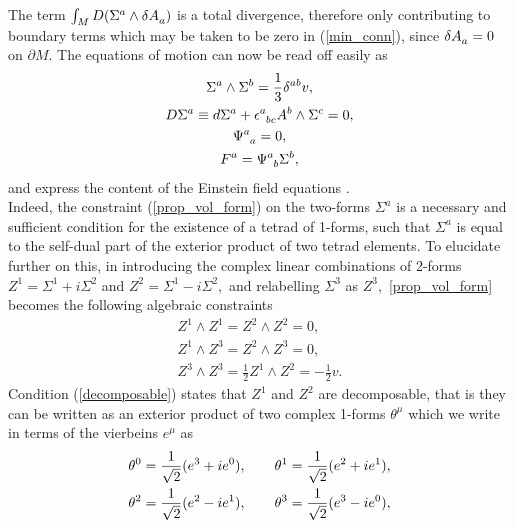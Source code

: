 \documentclass[a4paper,12pt, onecolumn, notitlepage]{article}
\theoremstyle{definition}
\theoremstyle{remark}
\newcommand{\m}{\mu}
\newcommand{\e}{\epsilon}
\begin{document}
The term $\int_{M} D(\Sigma\indices{^a}\wedge\delta A\indices{_a})$ is a total divergence, therefore only contributing to boundary terms which may be taken to be zero in (\ref{min_conn}), since $\delta A\indices{_a}=0$ on $\partial M.$ The equations of motion can now be read off easily as
\begin{subequations}
	\begin{gather}
\label{prop_vol_form}
\Sigma^{a}\wedge\Sigma^{b} = \frac{1}{3}\delta^{ab}v,\\
\label{cov_derivative}
D\Sigma^{a} \equiv d\Sigma^{a} + \e\indices{^a_b_c}A^{b}\wedge\Sigma^{c} = 0,\\
\label{traceless}
\Psi\indices{^a_a} = 0,\\
\label{weyl}
F^{a} = \Psi\indices{^a_b}\Sigma^{b},
	\end{gather}
\end{subequations}
and express the content of the Einstein field equations \cite{capovilla_1989, capovilla_1993}.\\
Indeed, the constraint (\ref{prop_vol_form}) on the two-forms $\Sigma^{a}$ is a necessary and sufficient condition for the existence of a tetrad of 1-forms, such that $\Sigma^{a}$ is equal to the self-dual part of the exterior product of two tetrad elements.
To elucidate further on this, in introducing the complex linear combinations of 2-forms $Z^{1} = \Sigma^{1}+ i\Sigma^{2}$ and $Z^{2} = \Sigma^{1}- i\Sigma^{2},$ and relabelling $\Sigma^{3}$ as $Z^{3},$ \cref{prop_vol_form} becomes the following algebraic constraints
\begin{subequations}
	\begin{gather}
	\label{decomposable}
	Z^{1}\wedge Z^{1}=Z^{2}\wedge Z^{2}=0,\\
	\label{orthogonal}
	Z^{1}\wedge Z^{3}= Z^{2}\wedge Z^{3}=0,\\
	\label{frame}
	Z^{3}\wedge Z^{3}=\frac{1}{2}Z^{1}\wedge Z^{2}=-\frac{1}{2}v.
	\end{gather}
\end{subequations}
Condition (\ref{decomposable}) states that $Z^{1}$ and $Z^{2}$ are decomposable, that is they can be written as an exterior product of two complex 1-forms $\theta^{\m}$ which we write in terms of the vierbeins $e^{\mu}$ as
\begin{gather*}
\theta\indices{^0}=\frac{1}{\sqrt{2}}(e\indices{^3}+ie\indices{^0}),\qquad\theta\indices{^1}=\frac{1}{\sqrt{2}}(e\indices{^2}+ie\indices{^1}),\\
\theta\indices{^2}=\frac{1}{\sqrt{2}}(e\indices{^2}-ie\indices{^1}),\qquad\theta\indices{^3}=\frac{1}{\sqrt{2}}(e\indices{^3}-ie\indices{^0}),
\end{gather*}
\end{document}
